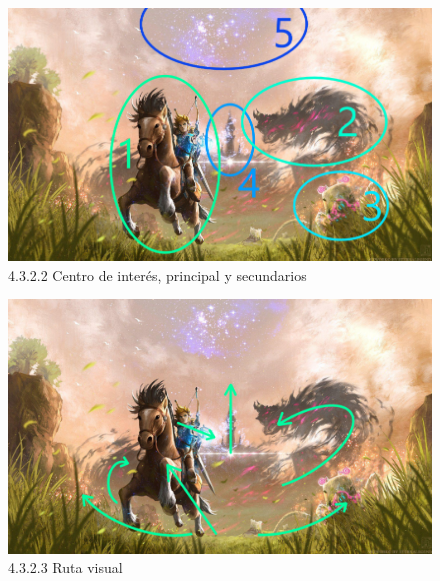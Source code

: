 \documentclass[12pt]{article}
\begin{document}
    \begin{figure}[H]
      \centering
      \includegraphics[scale=0.7]{images/Saúl/Sección 17/EA_img17_2Composicion_2PuntosInteres.png}
      \caption{\small 4.3.2.2 Centro de interés, principal y secundarios}
    \end{figure}



    \begin{figure}[H]
      \centering
      \includegraphics[scale=0.7]{images/Saúl/Sección 17/EA_img17_2Composicion_3RutaVisual.png}
      \caption{\small 4.3.2.3 Ruta visual}
    \end{figure}
\end{document}
